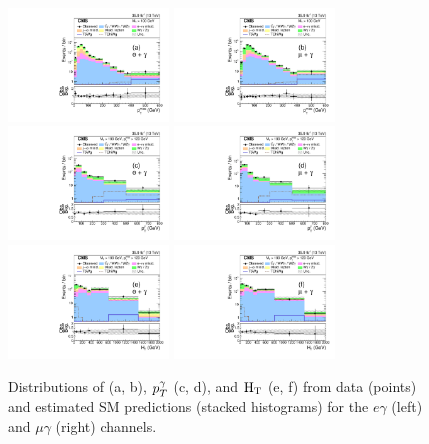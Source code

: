 \documentclass[thesis.tex]{subfiles}
\renewcommand\_{\textunderscore\allowbreak}
\begin{document}
\begin{figure}[htb]
\centering
\includegraphics[width=0.38\textwidth]{Fig/Figure_004-a.pdf}
\includegraphics[width=0.38\textwidth]{Fig/Figure_004-b.pdf} \\
\includegraphics[width=0.38\textwidth]{Fig/Figure_004-c.pdf}
\includegraphics[width=0.38\textwidth]{Fig/Figure_004-d.pdf} \\
\includegraphics[width=0.38\textwidth]{Fig/Figure_004-e.pdf}
\includegraphics[width=0.38\textwidth]{Fig/Figure_004-f.pdf}
\caption{Distributions of \MET (a, b), $p_T^{\mathrm{\gamma}}$ (c, d), and $\textrm{H}_\textrm{T}$
  (e, f) from data (points) and estimated SM predictions (stacked
  histograms) for the $e\gamma$ (left) and $\mu\gamma$ (right)
  channels.}
\label{fig:signalPhoPt} 
\end{figure}
\end{document}
